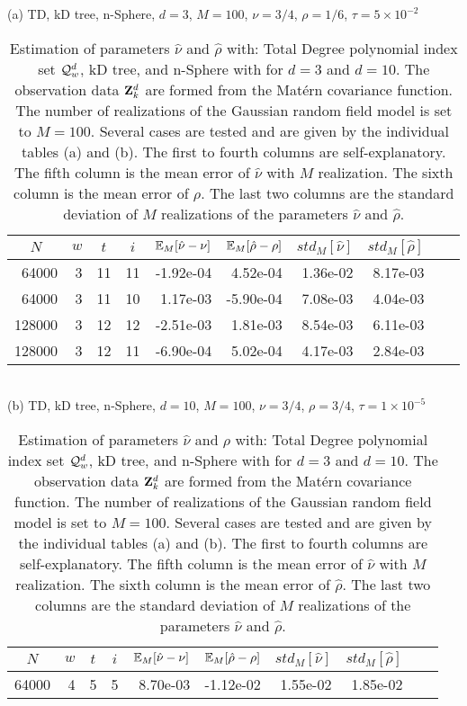 \documentclass[11pt,final]{amsart}       %
\begin{document}
\begin{table*}[htpb]
\caption{Estimation of parameters $\hat \nu$ and $\hat \rho$ with:
  Total Degree polynomial index set ${\mathcal Q}^d_w$, kD tree, and n-Sphere
  with for $d = 3$ and $d = 10$.  The observation data $\mathbf{Z}^d_k$ are
  formed from the Mat\'{e}rn covariance function. The number of
  realizations of the Gaussian random field model is set to $M =
  100$. Several cases are tested and are given by the individual tables
  (a) and (b).  The first to fourth columns are self-explanatory. The
  fifth column is the mean error of $\hat \nu$ with $M$
  realization. The sixth column is the mean error of $\hat \rho$. The
  last two columns are the standard deviation of $M$ realizations of
  the parameters $\hat \nu$ and $\hat \rho$.}
\begin{center}
(a) TD, kD tree, n-Sphere, $d = 3$, $M = 100$, $\nu =
  3/4$, $\rho = 1/6$, $\tau = 5 \times 10^{-2}$
\begin{tabular}{ r r r r r r r r r r}
\multicolumn{1}{c}{$N$} & 
\multicolumn{1}{c}{$w$} &
\multicolumn{1}{c}{$t$} &
\multicolumn{1}{c}{$i$} & 
\multicolumn{1}{c}{$\mathbb{E}_M [\hat{\nu} - \nu]$} &
\multicolumn{1}{c}{$\mathbb{E}_M [\hat{\rho} - \rho]$} &
\multicolumn{1}{c}{$std_M [\hat{\nu}]$} &
\multicolumn{1}{c}{$std_M [\hat{\rho}]$} 
 \\ 
 \hline
64000 & 3 & 11 & 11 & -1.92e-04 &  4.52e-04 & 1.36e-02 & 8.17e-03 \\ 
64000 & 3 & 11 & 10 &  1.17e-03 & -5.90e-04 & 7.08e-03 & 4.04e-03 \\ 
128000 & 3 & 12 & 12 & -2.51e-03 & 1.81e-03 & 8.54e-03 & 6.11e-03 \\ 
128000 & 3 & 12 & 11 & -6.90e-04 & 5.02e-04 & 4.17e-03 & 2.84e-03 \\ 
\end{tabular}
\\
\bigskip
(b) TD, kD tree, n-Sphere, $d = 10$, $M = 100$, $\nu =
  3/4$, $\rho = 3/4$, $\tau = 1 \times 10^{-5}$
\begin{tabular}{ r r r r r r r r r r}
\multicolumn{1}{c}{$N$} & 
\multicolumn{1}{c}{$w$} &
\multicolumn{1}{c}{$t$} &
\multicolumn{1}{c}{$i$} & 
\multicolumn{1}{c}{$\mathbb{E}_M [\hat{\nu} - \nu]$} &
\multicolumn{1}{c}{$\mathbb{E}_M [\hat{\rho} - \rho]$} &
\multicolumn{1}{c}{$std_M [\hat{\nu}]$} &
\multicolumn{1}{c}{$std_M [\hat{\rho}]$} 
 \\ 
 \hline
64000 & 4 & 5 & 5 &  8.70e-03 & -1.12e-02 & 1.55e-02 & 1.85e-02 \\ 

\end{tabular}
\end{center}
\end{table*}
\end{document}
